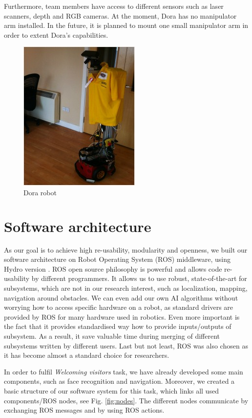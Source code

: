 \documentclass[conference]{IEEEtran}
\begin{document}
Furthermore, team members have access to different sensors such as laser scanners, depth and RGB cameras. At the moment, Dora has no manipulator arm installed. In the future, it is planned to mount one small manipulator arm in order to extent Dora's capabilities.

\begin{figure}[!t]
\centering
\includegraphics[width=2.in]{dorafinal.jpg}
\caption{Dora robot}
\label{fig:dora}
\end{figure}

\section{Software architecture}

As our goal is to achieve high re-usability, modularity and openness, we built our software architecture on Robot Operating System (ROS) middleware, using Hydro version \cite{ros}. ROS open source philosophy is powerful and allows code re-usability by different programmers. It allows us to use robust, state-of-the-art for subsystems, which are not in our research interest, such as localization, mapping, navigation around obstacles. We can even add our own AI algorithms without worrying how to access specific hardware on a robot, as standard drivers are provided by ROS for many hardware used in robotics. Even more important is the fact that it provides standardised way how to provide inputs/outputs of subsystem. As a result, it save valuable time during merging of different subsystems written by different users. Last but not least, ROS was also chosen as it has become almost a standard choice for researchers.

In order to fulfil \textit{Welcoming visitors} task, we have already developed some main components, such as face recognition and navigation. Moreover, we created a basic structure of our software system for this task, which links all used components/ROS nodes, see Fig. \ref{fig:nodes}. The different nodes communicate by exchanging ROS messages and by using ROS actions. 
\end{document}
